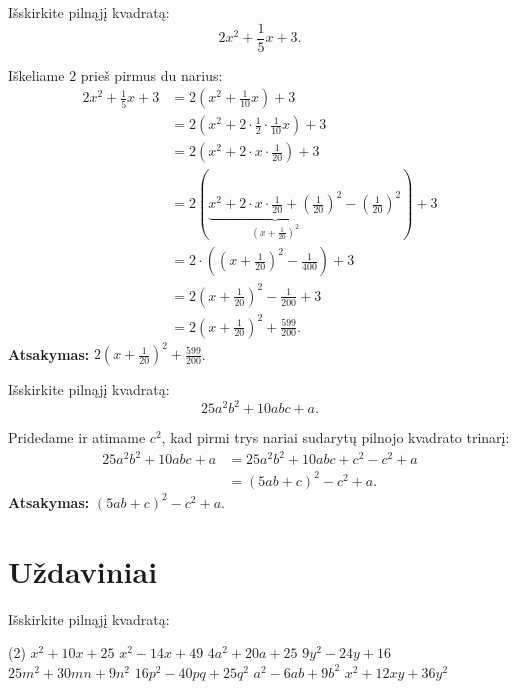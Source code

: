 \documentclass[11pt,a4paper]{scrartcl}
\begin{document}
\begin{example}
Išskirkite pilnąjį kvadratą:
\[
2x^2+\frac{1}{5}x+3.
\]
\end{example}
\begin{solution}
Iškeliame $2$ prieš pirmus du narius:
\[
\begin{aligned}
2x^2+\frac{1}{5}x+3
&=2\left(x^2+\frac{1}{10}x\right)+3\\
&=2\left(x^2+2\cdot\frac{1}{2}\cdot\frac{1}{10}x\right)+3\\
&=2\left(x^2+2\cdot x\cdot\frac{1}{20}\right)+3\\
&=2\left(\underbrace{x^2+2\cdot x\cdot\frac{1}{20}+\left(\frac{1}{20}\right)^2}_{\left(x+\frac{1}{20}\right)^2}-\left(\frac{1}{20}\right)^2\right)+3\\
&=2\cdot\left(\left(x+\frac{1}{20}\right)^2-\frac{1}{400}\right)+3\\
&=2\left(x+\frac{1}{20}\right)^2-\frac{1}{200}+3\\
&=2\left(x+\frac{1}{20}\right)^2+\frac{599}{200}.
\end{aligned}
\]
\textbf{Atsakymas:} $2\left(x+\frac{1}{20}\right)^2+\frac{599}{200}$.
\end{solution}

\begin{example}
Išskirkite pilnąjį kvadratą:
\[
25a^2b^2+10abc+a.
\]
\end{example}
\begin{solution}
Pridedame ir atimame $c^2$, kad pirmi trys nariai sudarytų pilnojo kvadrato trinarį:
\[
\begin{aligned}
25a^2b^2+10abc+a
&=25a^2b^2+10abc+c^2-c^2+a\\
&=(5ab+c)^2-c^2+a.
\end{aligned}
\]
\textbf{Atsakymas:} $(5ab+c)^2-c^2+a$.
\end{solution}

\section{Uždaviniai}

\begin{problem}
Išskirkite pilnąjį kvadratą:
\begin{tasks}[label={(\arabic*)}, label-offset=0.9em](2)
	\task $x^2+10x+25$
	\task $x^2-14x+49$
	\task $4a^2+20a+25$
	\task $9y^2-24y+16$
	\task $25m^2+30mn+9n^2$
	\task $16p^2-40pq+25q^2$
	\task $a^2-6ab+9b^2$
	\task $x^2+12xy+36y^2$
\end{tasks}
\end{problem}
\end{document}

